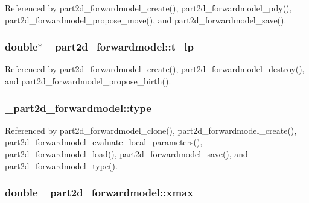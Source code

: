 Referenced by part2d\+\_\+forwardmodel\+\_\+create(), part2d\+\_\+forwardmodel\+\_\+pdy(), part2d\+\_\+forwardmodel\+\_\+propose\+\_\+move(), and part2d\+\_\+forwardmodel\+\_\+save().

\subsubsection[{\texorpdfstring{t\+\_\+lp}{t_lp}}]{\setlength{\rightskip}{0pt plus 5cm}double$\ast$ \+\_\+part2d\+\_\+forwardmodel\+::t\+\_\+lp}\hypertarget{struct__part2d__forwardmodel_a8d34c3b23e939d1f446f239b1e47e2f0}{}\label{struct__part2d__forwardmodel_a8d34c3b23e939d1f446f239b1e47e2f0}


Referenced by part2d\+\_\+forwardmodel\+\_\+create(), part2d\+\_\+forwardmodel\+\_\+destroy(), and part2d\+\_\+forwardmodel\+\_\+propose\+\_\+birth().

\subsubsection[{\texorpdfstring{type}{type}}]{ \+\_\+part2d\+\_\+forwardmodel\+::type}\hypertarget{struct__part2d__forwardmodel_a47f7fe3ae2ce8606543e1b3abe43a425}{}\label{struct__part2d__forwardmodel_a47f7fe3ae2ce8606543e1b3abe43a425}


Referenced by part2d\+\_\+forwardmodel\+\_\+clone(), part2d\+\_\+forwardmodel\+\_\+create(), part2d\+\_\+forwardmodel\+\_\+evaluate\+\_\+local\+\_\+parameters(), part2d\+\_\+forwardmodel\+\_\+load(), part2d\+\_\+forwardmodel\+\_\+save(), and part2d\+\_\+forwardmodel\+\_\+type().

\subsubsection[{\texorpdfstring{xmax}{xmax}}]{\setlength{\rightskip}{0pt plus 5cm}double \+\_\+part2d\+\_\+forwardmodel\+::xmax}\hypertarget{struct__part2d__forwardmodel_a5d7a37b791afeef33707fafd0ea06813}{}\label{struct__part2d__forwardmodel_a5d7a37b791afeef33707fafd0ea06813}


